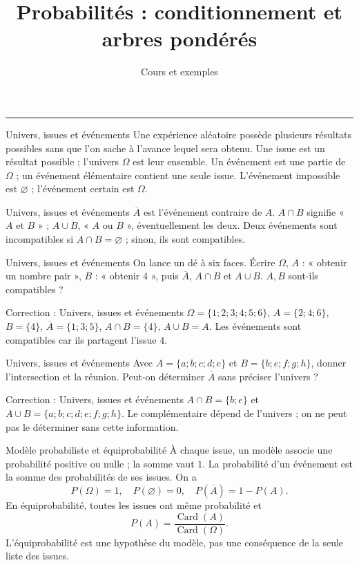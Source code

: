 \documentclass[aspectratio=169,10pt]{beamer}
\title{Probabilités : conditionnement et arbres pondérés}
\subtitle{Cours et exemples}
\date{}
\author{}
\providecommand{\Card}{\operatorname{Card}}
\begin{document}
\begin{frame}[plain]
\vfill
{\inserttitle\par}
\medskip
{\insertsubtitle\par}
\medskip
{\rule{\textwidth}{.5pt}}
\vfill
\end{frame}
\begin{frame}{Univers, issues et événements}
Une expérience aléatoire possède plusieurs résultats possibles sans que l'on sache à l'avance lequel sera obtenu. Une issue est un résultat possible ; l'univers \(\Omega\) est leur ensemble. Un événement est une partie de \(\Omega\) ; un événement élémentaire contient une seule issue.
L'événement impossible est \(\varnothing\) ; l'événement certain est \(\Omega\).
\end{frame}
\begin{frame}{Univers, issues et événements}
\(\overline A\) est l'événement contraire de \(A\). \(A\cap B\) signifie « \(A\) et \(B\) » ; \(A\cup B\), « \(A\) ou \(B\) », éventuellement les deux. Deux événements sont incompatibles si \(A\cap B=\varnothing\) ; sinon, ils sont compatibles.
\end{frame}
\begin{frame}{Univers, issues et événements}
On lance un dé à six faces. Écrire \(\Omega\), \(A\) : « obtenir un nombre pair », \(B\) : « obtenir \(4\) », puis \(\overline A\), \(A\cap B\) et \(A\cup B\). \(A,B\) sont-ils compatibles ?
\end{frame}
\begin{frame}{Correction : Univers, issues et événements}
\(\Omega=\{1;2;3;4;5;6\}\), \(A=\{2;4;6\}\), \(B=\{4\}\), \(\overline A=\{1;3;5\}\), \(A\cap B=\{4\}\), \(A\cup B=A\). Les événements sont compatibles car ils partagent l'issue \(4\).
\end{frame}
\begin{frame}{Univers, issues et événements}
Avec \(A=\{a;b;c;d;e\}\) et \(B=\{b;e;f;g;h\}\), donner l'intersection et la réunion. Peut-on déterminer \(\overline A\) sans préciser l'univers ?
\end{frame}
\begin{frame}{Correction : Univers, issues et événements}
\(A\cap B=\{b;e\}\) et \(A\cup B=\{a;b;c;d;e;f;g;h\}\). Le complémentaire dépend de l'univers ; on ne peut pas le déterminer sans cette information.
\end{frame}
\begin{frame}{Modèle probabiliste et équiprobabilité}
À chaque issue, un modèle associe une probabilité positive ou nulle ; la somme vaut \(1\). La probabilité d'un événement est la somme des probabilités de ses issues. On a
\[P(\Omega)=1,\quad P(\varnothing)=0,\quad P(\overline A)=1-P(A).\]
En équiprobabilité, toutes les issues ont même probabilité et
\[P(A)=\dfrac{\Card(A)}{\Card(\Omega)}.\]
L'équiprobabilité est une hypothèse du modèle, pas une conséquence de la seule liste des issues.
\end{frame}
\end{document}
